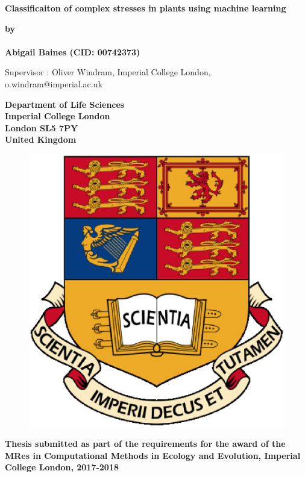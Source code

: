 \thispagestyle{empty}
\null\vskip0.2in%
\begin{center}
\LARGE{{\bf 
Classificaiton of complex stresses in plants using machine learning}}
\end{center}

\vspace{0.5cm}

\begin{center}
{\Large {\bf by}}\\
\mbox{} \\
{\Large {\bf Abigail Baines (CID: 00742373)}}

{\Large Supervisor : Oliver Windram, Imperial College London, o.windram@imperial.ac.uk}
\end{center}

\vspace{1cm}

\begin{center}
\large{\bf{Department of Life Sciences \\ Imperial College London \\
London SL5 7PY \\ United Kingdom}}
\end{center}


\vspace{1.5cm}

\begin{figure}[!h]
\centering
\includegraphics[scale=0.4]{IC_Crest.eps}
\end{figure}

\vspace{1.5cm}

\begin{center}
\large{\bf{Thesis submitted as part of the requirements for the award of the \\
MRes in Computational Methods in Ecology and Evolution, Imperial College London, 2017-2018}}
\end{center}

\vspace{2cm}

